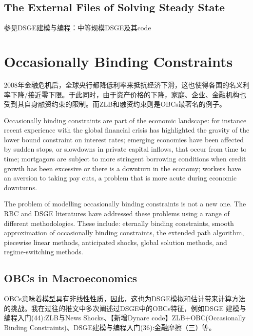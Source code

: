 \documentclass[cn,10pt,math=newtx,citestyle=gb7714-2015,bibstyle=gb7714-2015]{elegantbook}
\begin{document}
	
	\section{The External Files of Solving Steady State}
	
	参见DSGE建模与编程：中等规模DSGE及其code
	
	
	\chapter{Occasionally Binding Constraints}
	
2008年金融危机后，全球央行都降低利率来抵抗经济下滑，这也使得各国的名义利率下降/接近零下限。于此同时，由于资产价格的下降，家庭、企业、金融机构也受到其自身融资约束的限制。而ZLB和融资约束则是OBCs最著名的例子。

Occasionally binding constraints are part of the economic landscape: for instance recent experience with the global financial crisis has highlighted the gravity of the lower bound constraint on interest rates; emerging economies have been affected by sudden stops, or slowdowns in private capital inflows, that occur from time to time; mortgagors are subject
to more stringent borrowing conditions when credit growth has been excessive or there is a downturn in the economy; workers have an aversion to taking pay cuts, a problem that is more acute during economic downturns.

The problem of modelling occasionally binding constraints is not a new one. The RBC and DSGE literatures have addressed these problems using a range of different methodologies. These include: eternally binding constraints, smooth approximation of occasionally binding constraints, the extended path algorithm, piecewise linear methods, anticipated shocks, global solution methods, and regime-switching methods.

\section{OBCs in Macroeconomics} \label{sec:modsetup}

OBCs意味着模型具有非线性性质，因此，这也为DSGE模拟和估计带来计算方法的挑战。我在过往的推文中多次阐述过DSGE中的OBCs特征，例如DSGE 建模与编程入门(44):ZLB与News Shocks、【新增Dynare code】ZLB+OBC(Occasionally Binding Constraints)、DSGE建模与编程入门(36):金融摩擦（三）等。
\end{document}
